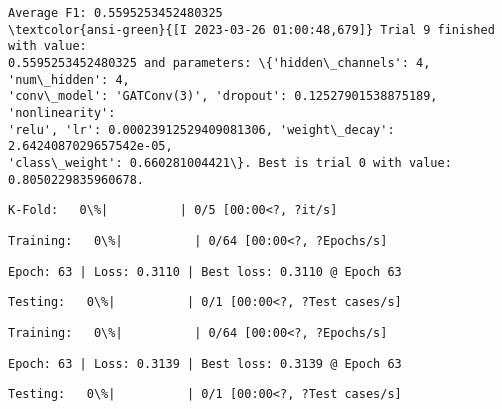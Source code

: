 \documentclass[11pt]{article}
\begin{document}
    
    \begin{Verbatim}[commandchars=\\\{\}]
Average F1: 0.5595253452480325
\textcolor{ansi-green}{[I 2023-03-26 01:00:48,679]} Trial 9 finished with value:
0.5595253452480325 and parameters: \{'hidden\_channels': 4, 'num\_hidden': 4,
'conv\_model': 'GATConv(3)', 'dropout': 0.12527901538875189, 'nonlinearity':
'relu', 'lr': 0.00023912529409081306, 'weight\_decay': 2.6424087029657542e-05,
'class\_weight': 0.660281004421\}. Best is trial 0 with value:
0.8050229835960678.
    \end{Verbatim}

    
    \begin{Verbatim}[commandchars=\\\{\}]
K-Fold:   0\%|          | 0/5 [00:00<?, ?it/s]
    \end{Verbatim}

    
    
    \begin{Verbatim}[commandchars=\\\{\}]
Training:   0\%|          | 0/64 [00:00<?, ?Epochs/s]
    \end{Verbatim}

    
    \begin{Verbatim}[commandchars=\\\{\}]
Epoch: 63 | Loss: 0.3110 | Best loss: 0.3110 @ Epoch 63
    \end{Verbatim}

    
    \begin{Verbatim}[commandchars=\\\{\}]
Testing:   0\%|          | 0/1 [00:00<?, ?Test cases/s]
    \end{Verbatim}

    
    
    \begin{Verbatim}[commandchars=\\\{\}]
Training:   0\%|          | 0/64 [00:00<?, ?Epochs/s]
    \end{Verbatim}

    
    \begin{Verbatim}[commandchars=\\\{\}]
Epoch: 63 | Loss: 0.3139 | Best loss: 0.3139 @ Epoch 63
    \end{Verbatim}

    
    \begin{Verbatim}[commandchars=\\\{\}]
Testing:   0\%|          | 0/1 [00:00<?, ?Test cases/s]
    \end{Verbatim}
\end{document}
